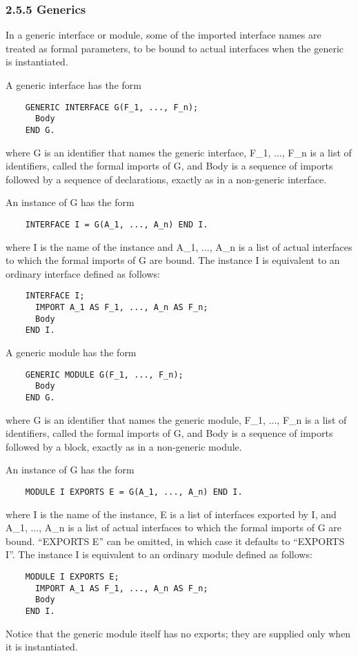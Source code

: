 \documentclass[10pt]{article}
\begin{document}
\subsubsection*{2.5.5 Generics}

In a generic interface or module, some of the imported interface names are
treated as formal parameters, to be bound to actual interfaces when the
generic is instantiated.

A generic interface has the form
\begin{verbatim}
    GENERIC INTERFACE G(F_1, ..., F_n);
      Body
    END G.
\end{verbatim}
where G is an identifier that names the generic interface, F\_1, ..., F\_n is
a list of identifiers, called the formal imports of G, and Body is a sequence
of imports followed by a sequence of declarations, exactly as in a non-generic
interface.

An instance of G has the form
\begin{verbatim}
    INTERFACE I = G(A_1, ..., A_n) END I.
\end{verbatim}
where I is the name of the instance and A\_1, ..., A\_n is a list of actual
interfaces to which the formal imports of G are bound.  The instance I is
equivalent to an ordinary interface defined as follows:
\begin{verbatim}
    INTERFACE I;
      IMPORT A_1 AS F_1, ..., A_n AS F_n;
      Body
    END I.
\end{verbatim}

A generic module has the form
\begin{verbatim}
    GENERIC MODULE G(F_1, ..., F_n);
      Body
    END G.
\end{verbatim}
where G is an identifier that names the generic module, F\_1, ..., F\_n is a
list of identifiers, called the formal imports of G, and Body is a sequence of
imports followed by a block, exactly as in a non-generic module.

An instance of G has the form
\begin{verbatim}
    MODULE I EXPORTS E = G(A_1, ..., A_n) END I.
\end{verbatim}
where I is the name of the instance, E is a list of interfaces exported by I,
and A\_1, ..., A\_n is a list of actual interfaces to which the formal imports
of G are bound.  ``EXPORTS E'' can be omitted, in which case it defaults to
``EXPORTS I''.  The instance I is equivalent to an ordinary module defined as
follows:
\begin{verbatim}
    MODULE I EXPORTS E;
      IMPORT A_1 AS F_1, ..., A_n AS F_n;
      Body
    END I.
\end{verbatim}
Notice that the generic module itself has no exports; they are supplied only
when it is instantiated.
\end{document}
